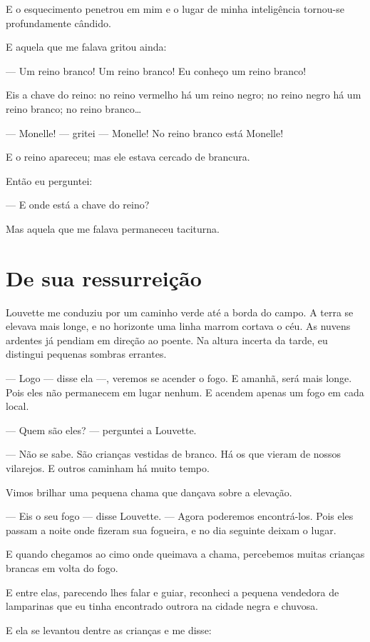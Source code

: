 E o esquecimento penetrou em mim e o lugar de minha inteligência
tornou-se profundamente cândido.

E aquela que me falava gritou ainda:

--- Um reino branco! Um reino branco! Eu conheço um reino branco!

Eis a chave do reino: no reino vermelho há um reino negro; no reino
negro há um reino branco; no reino branco\ldots{}

--- Monelle! --- gritei --- Monelle! No reino branco está Monelle!

E o reino apareceu; mas ele estava cercado de \mbox{brancura.}

Então eu perguntei:

--- E onde está a chave do reino?

Mas aquela que me falava permaneceu taciturna.

\section{De sua ressurreição}

Louvette me conduziu por um caminho verde até a borda do campo. A terra
se elevava mais longe, e no horizonte uma linha marrom cortava o céu. As
nuvens ardentes já pendiam em direção ao poente. Na altura incerta da
tarde, eu distingui pequenas sombras errantes.

--- Logo --- disse ela ---, veremos se acender o fogo. E amanhã, será mais
longe. Pois eles não permanecem em lugar nenhum. E acendem apenas um
fogo em cada local.

--- Quem são eles? --- perguntei a Louvette.

--- Não se sabe. São crianças vestidas de branco. Há os que vieram de
nossos vilarejos. E outros caminham há muito tempo.

Vimos brilhar uma pequena chama que dançava sobre a elevação.

--- Eis o seu fogo --- disse Louvette. --- Agora poderemos encontrá-los. Pois
eles passam a noite onde fizeram sua fogueira, e no dia seguinte deixam o
lugar.

E quando chegamos ao cimo onde queimava a chama, percebemos muitas
crianças brancas em volta do fogo.

E entre elas, parecendo lhes falar e guiar, reconheci a pequena
vendedora de lamparinas que eu tinha encontrado outrora na cidade negra e
chuvosa.

E ela se levantou dentre as crianças e me disse:

